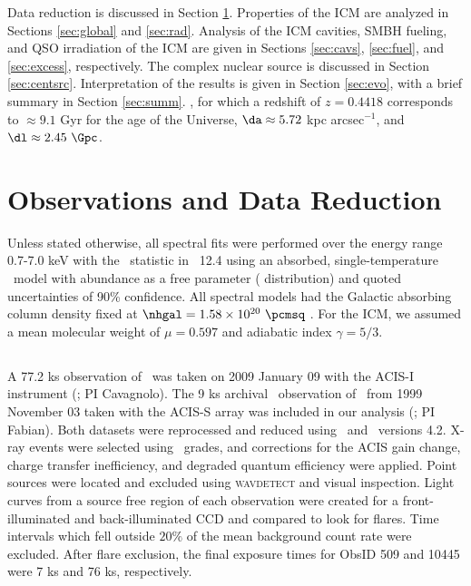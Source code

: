 \documentclass[useAMS,usenatbib]{mn2e}
\begin{document}
Data reduction is discussed in Section \ref{sec:obs}. Properties of
the ICM are analyzed in Sections \ref{sec:global} and
\ref{sec:rad}. Analysis of the ICM cavities, SMBH fueling, and QSO
irradiation of the ICM are given in Sections \ref{sec:cavs},
\ref{sec:fuel}, and \ref{sec:excess}, respectively. The complex
nuclear source is discussed in Section
\ref{sec:centsrc}. Interpretation of the results is given in Section
\ref{sec:evo}, with a brief summary in Section \ref{sec:summ}. \LCDM,
for which a redshift of $z = 0.4418$ corresponds to $\approx 9.1$ Gyr
for the age of the Universe, $\da \approx 5.72$ kpc arcsec$^{-1}$, and
$\dl \approx 2.45~\Gpc$.

\section{Observations and Data Reduction}
\label{sec:obs}

Unless stated otherwise, all spectral fits were performed over the
energy range 0.7-7.0 keV with the \chisq\ statistic in \xspec\ 12.4
\citep{xspec} using an absorbed, single-temperature \mekal\ model
\citep{mekal1} with abundance as a free parameter (\citealt{ag89}
distribution) and quoted uncertainties of 90\% confidence. All
spectral models had the Galactic absorbing column density fixed at
$\nhgal = 1.58 \times 10^{20} ~\pcmsq$ \citep{lab}. For the ICM, we
assumed a mean molecular weight of $\mu = 0.597$ and adiabatic index
$\gamma = 5/3$.

\subsection{\chandra}
\label{sec:xray}

A 77.2 ks observation of \irs\ was taken on 2009 January 09 with the
ACIS-I instrument (; PI
Cavagnolo). The 9 ks archival \chandra\ observation of \irs\ from 1999
November 03 taken with the ACIS-S array was included in our analysis
(; PI Fabian). Both
datasets were reprocessed and reduced using \ciao\ and
\caldb\ versions 4.2. X-ray events were selected using \asca\ grades,
and corrections for the ACIS gain change, charge transfer
inefficiency, and degraded quantum efficiency were applied. Point
sources were located and excluded using {\textsc{wavdetect}} and
visual inspection. Light curves from a source free region of each
observation were created for a front-illuminated and back-illuminated
CCD and compared to look for flares. Time intervals which fell outside
$20\%$ of the mean background count rate were excluded. After flare
exclusion, the final exposure times for ObsID 509 and 10445 were 7 ks
and 76 ks, respectively.
\end{document}
